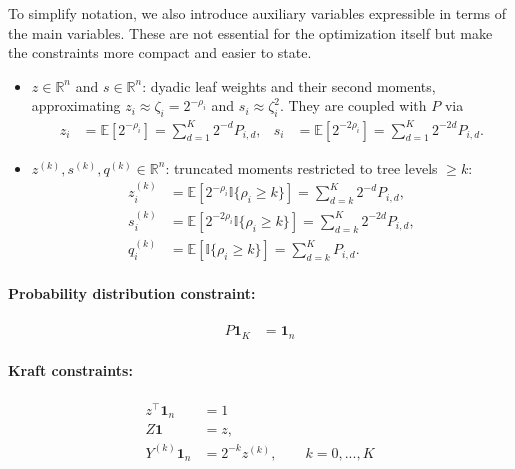 \documentclass{article}
\begin{document}
To simplify notation, we also introduce auxiliary variables expressible in terms of the main variables. These are not essential for the optimization itself but make the constraints more compact and easier to state.

\begin{itemize}
    \item $z\in\mathbb{R}^n$ and $s\in\mathbb{R}^n$: dyadic leaf
    weights and their second moments, approximating
    $z_i\approx\zeta_i=2^{-\rho_i}$ and $s_i\approx\zeta_i^2$.
    They are coupled with $P$ via
    \begin{align}\label{constr:zdef}
    z_i &= \mathbb{E}[2^{-\rho_i}]
    = \sum_{d=1}^K 2^{-d} P_{i,d}, &
    s_i &= \mathbb{E}[2^{-2\rho_i}]
    = \sum_{d=1}^K 2^{-2d} P_{i,d}.
    \end{align}      

    \item $z^{(k)}, s^{(k)}, q^{(k)} \in \mathbb{R}^n$:
    truncated moments restricted to tree levels $\ge k$:
    \begin{align}
    z_i^{(k)} &= \mathbb{E}\!\left[2^{-\rho_i}\mathbb{I}\{\rho_i\ge k\}\right]
              = \sum_{d=k}^K 2^{-d}P_{i,d}, \label{constr:zk}\\
    s_i^{(k)} &= \mathbb{E}\!\left[2^{-2\rho_i}\mathbb{I}\{\rho_i\ge k\}\right]
              = \sum_{d=k}^K 2^{-2d}P_{i,d}, \label{constr:sk}\\
    q_i^{(k)} &= \mathbb{E}\!\left[\mathbb{I}\{\rho_i\ge k\}\right]
              = \sum_{d=k}^K P_{i,d}. \label{constr:qk}
    \end{align}
\end{itemize}

\paragraph{Probability distribution constraint:}

\begin{align}
P\mathbf{1}_K &= \mathbf{1}_n \label{constr:onedepth} 
\end{align}

\paragraph{Kraft constraints:}

\begin{align}
z^{\top}\mathbf{1}_n &= 1 \label{constr:kraft}\\
Z\mathbf{1} &= z, \label{constr:Z-rowsum} \\
Y^{(k)} \mathbf{1}_n &= 2^{-k} z^{(k)}, \qquad k=0,...,K \label{constr:kraftlevel}
\end{align}
\end{document}
